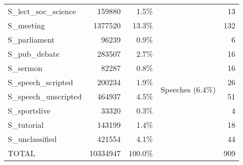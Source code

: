 {\begin{tabular}{lrrcr}
        S\_lect\_soc\_science       & 159880   & 1.5\%   &                                     & 13    \\ \cline{4-4}
        S\_meeting                  & 1377520  & 13.3\%  &                                     & 132   \\
        S\_parliament               & 96239    & 0.9\%   &                                     & 6     \\
        S\_pub\_debate              & 283507   & 2.7\%   &                                     & 16    \\
        S\_sermon                   & 82287    & 0.8\%   &                                     & 16    \\ \cline{4-4}
        S\_speech\_scripted         & 200234   & 1.9\%   & \multirow{2}{*}{Speeches (6.4\%)}   & 26    \\
        S\_speech\_unscripted       & 464937   & 4.5\%   &                                     & 51    \\ \cline{4-4}
        S\_sportslive               & 33320    & 0.3\%   &                                     & 4     \\
        S\_tutorial                 & 143199   & 1.4\%   &                                     & 18    \\
        S\_unclassified             & 421554   & 4.1\%   &                                     & 44    \\ \hline
        TOTAL                       & 10334947 & 100.0\% &                                     & 909   \\ \hline
    \end{tabular}
}




